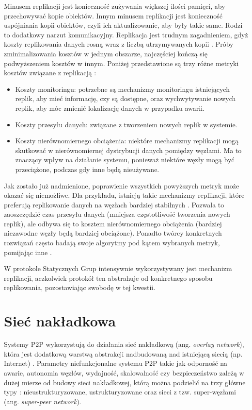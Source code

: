 \documentclass[12pt, twoside, openany]{report}
\begin{document}
Minusem replikacji jest konieczność zużywania większej ilości pamięci, aby przechowywać kopie obiektów. Innym minusem replikacji jest konieczność uspójniania kopii obiektów, czyli ich aktualizowanie, aby były takie same. Rodzi to dodatkowy narzut komunikacyjny. Replikacja jest trudnym zagadnieniem, gdyż koszty replikowania danych rosną wraz z liczbą utrzymywanych kopii \cite{bib:rollerchain}. Próby zminimalizowania kosztów w jednym obszarze, najczęściej kończą się podwyższeniem kosztów w innym. Poniżej przedstawione są trzy różne metryki kosztów związane z replikacją \cite{bib:paiva}:
\begin{itemize}
\item Koszty monitoringu: potrzebne są mechanizmy monitoringu istniejących replik, aby mieć informację, czy są dostępne, oraz wychwytywanie nowych replik, aby móc zmienić lokalizację danych w przypadku awarii.
\item Koszty przesyłu danych: związane z tworzeniem nowych replik w systemie.
\item Koszty nierównomiernego obciążenia: niektóre mechanizmy replikacji mogą skutkować w nierównomiernej dystrybucji danych pomiędzy węzłami. Ma to znaczący wpływ na działanie systemu, ponieważ niektóre węzły mogą być przeciążone, podczas gdy inne będą nieużywane.
\end{itemize}

Jak zostało już nadmienione, poprawienie wszystkich powyższych metryk może okazać się niemożliwe. Dla przykładu, istnieją takie mechanizmy replikacji, które preferują replikowanie danych na węzłach bardziej stabilnych \cite{bib:paiva}. Pozwala to zaoszczędzić czas przesyłu danych (mniejsza częstotliwość tworzenia nowych replik), ale odbywa się to kosztem nierównomiernego obciążenia (bardziej niezawodne węzły będą bardziej obciążone). Ponadto twórcy konkretnych rozwiązań często badają swoje algorytmy pod kątem wybranych metryk, pomijając inne \cite{bib:paiva}.

W protokole Statycznych Grup intensywnie wykorzystywany jest mechanizm replikacji, aczkolwiek protokół ten abstrahuje od konkretnego sposobu replikowania, pozostawiając swobodę w tej kwestii.


\section{Sieć nakładkowa}
Systemy P2P wykorzystują do działania sieć nakładkową (ang. \textit{overlay network}), która jest dodatkową warstwą abstrakcji nadbudowaną nad istniejącą siecią (np. Internet) \cite{bib:martins, bib:kobusinska}. Parametry niefunkcjonalne systemu P2P takie jak odporność na awarie, autonomia węzłów, wydajność, skalowalność czy bezpieczeństwo zależą w dużej mierze od budowy sieci nakładkowej, którą można podzielić na trzy główne typy \cite{bib:martins}: nieustrukturyzowane, ustrukturyzowane oraz sieci z tzw. super-węzłami (ang. \textit{super-peer network}).
\end{document}

